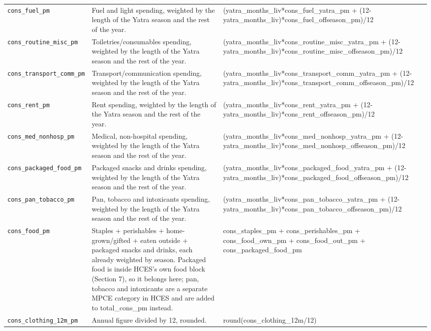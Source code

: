 \documentclass[10pt]{article}
\begin{document}
{\begin{longtable}{p{3.3cm}p{7.6cm}p{5.7cm}}
\texttt{cons\_fuel\_pm} & Fuel and light spending, weighted by the length of the Yatra season and the rest of the year. & (yatra\_months\_liv*cons\_fuel\_yatra\_pm + (12-yatra\_months\_liv)*cons\_fuel\_offseason\_pm)/12 \\
\texttt{cons\_routine\_misc\_pm} & Toiletries/consumables spending, weighted by the length of the Yatra season and the rest of the year. & (yatra\_months\_liv*cons\_routine\_misc\_yatra\_pm + (12-yatra\_months\_liv)*cons\_routine\_misc\_offseason\_pm)/12 \\
\texttt{cons\_transport\_comm\_pm} & Transport/communication spending, weighted by the length of the Yatra season and the rest of the year. & (yatra\_months\_liv*cons\_transport\_comm\_yatra\_pm + (12-yatra\_months\_liv)*cons\_transport\_comm\_offseason\_pm)/12 \\
\texttt{cons\_rent\_pm} & Rent spending, weighted by the length of the Yatra season and the rest of the year. & (yatra\_months\_liv*cons\_rent\_yatra\_pm + (12-yatra\_months\_liv)*cons\_rent\_offseason\_pm)/12 \\
\texttt{cons\_med\_nonhosp\_pm} & Medical, non-hospital spending, weighted by the length of the Yatra season and the rest of the year. & (yatra\_months\_liv*cons\_med\_nonhosp\_yatra\_pm + (12-yatra\_months\_liv)*cons\_med\_nonhosp\_offseason\_pm)/12 \\
\texttt{cons\_packaged\_food\_pm} & Packaged snacks and drinks spending, weighted by the length of the Yatra season and the rest of the year. & (yatra\_months\_liv*cons\_packaged\_food\_yatra\_pm + (12-yatra\_months\_liv)*cons\_packaged\_food\_offseason\_pm)/12 \\
\texttt{cons\_pan\_tobacco\_pm} & Pan, tobacco and intoxicants spending, weighted by the length of the Yatra season and the rest of the year. & (yatra\_months\_liv*cons\_pan\_tobacco\_yatra\_pm + (12-yatra\_months\_liv)*cons\_pan\_tobacco\_offseason\_pm)/12 \\
\texttt{cons\_food\_pm} & Staples + perishables + home-grown/gifted + eaten outside + packaged snacks and drinks, each already weighted by season. Packaged food is inside HCES's own food block (Section 7), so it belongs here; pan, tobacco and intoxicants are a separate MPCE category in HCES and are added to total\_cons\_pm instead. & cons\_staples\_pm + cons\_perishables\_pm + cons\_food\_own\_pm + cons\_food\_out\_pm + cons\_packaged\_food\_pm \\
\texttt{cons\_clothing\_12m\_pm} & Annual figure divided by 12, rounded. & round(cons\_clothing\_12m/12) \\

\end{longtable}}
\end{document}
